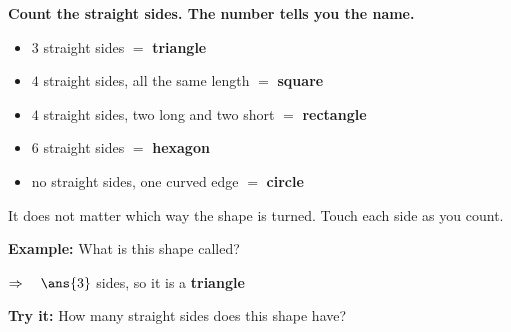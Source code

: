\documentclass[12pt]{article}
\begin{document}


\begin{formulabox}
\textbf{Count the straight sides. The number tells you the name.}
\begin{itemize}[label={$\bullet$}, leftmargin=1.1cm, itemsep=1pt, topsep=2pt]
  \item $3$ straight sides $=$ \textbf{triangle}
  \item $4$ straight sides, all the same length $=$ \textbf{square}
  \item $4$ straight sides, two long and two short $=$ \textbf{rectangle}
  \item $6$ straight sides $=$ \textbf{hexagon}
  \item no straight sides, one curved edge $=$ \textbf{circle}
\end{itemize}
It does not matter which way the shape is turned. Touch each side as you count.
\end{formulabox}

\begin{examplebox}
\textbf{Example:} \quad What is this shape called?
\begin{center}
\end{center}

$\Rightarrow\quad \ans{3}$ sides, so it is a \textbf{triangle}
\end{examplebox}

\begin{tryitbox}
\textbf{Try it:} \quad How many straight sides does this shape have?
\begin{center}
\end{center}
\end{tryitbox}
\end{document}
